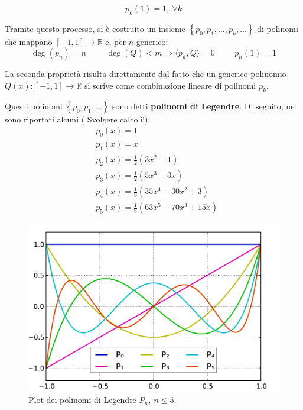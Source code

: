 \documentclass[11pt, a4paper]{scrartcl}
\theoremstyle{definition}
\numberwithin{esempio}{section}
\theoremstyle{definition}
\numberwithin{obs}{section}
\numberwithin{nota}{section}
\newenvironment{boxenv}[1][]{
    \begin{eqbox}[#1]
    }{
   \end{eqbox}
}
\numberwithin{equation}{subsection}
\begin{document}
\begin{equation}
	p_k(1) = 1, \ \forall k
\end{equation}
\begin{boxenv}[]
	Tramite questo processo, si \`e costruito un insieme $\left\{ p_0,p_1,\ldots,p_k,\ldots \right\} $ di polinomi che mappano $[-1,1] \to \mathbb{R}$ e, per $n$ generico:
	\begin{equation}
		\operatorname{deg} (p_n) = n \hspace{1cm} \operatorname{deg} (Q) < m \Rightarrow  \langle p_n, Q \rangle =0 \hspace{1cm} p_n(1) = 1
	\end{equation}
\end{boxenv}
La seconda propriet\`a risulta direttamente dal fatto che un generico polinomio $Q(x):\left[ -1,1 \right] \to \mathbb{R}$ si scrive come combinazione lineare di polinomi $ p_k $.

Questi polinomi $\left\{ p_0,p_1,\ldots \right\} $ sono detti \textbf{polinomi di Legendre}. 
Di seguito, ne sono riportati alcuni ({\color{red} Svolgere calcoli!}):
\[
	\begin{split}
		&p_0(x) = 1\\
		&p_1(x)= x\\
		&p_2(x) = \frac{1}{2}(3x^2 -1)\\
		&p_3(x) = \frac{1}{2}(5x^3-3x)\\
		&p_4(x) = \frac{1}{8}(35x^4-30x^2+3)\\
		&p_5(x) = \frac{1}{8}(63x^5 -70x^3+15x)
	\end{split}
\] 
\begin{figure}[h!]
	\centering
	\includegraphics[width=.6\columnwidth]{lp-plot.pdf}
	\caption{Plot dei polinomi di Legendre $P_n, \ n\le 5$.}
	\label{lpplot}
\end{figure}
\end{document}

